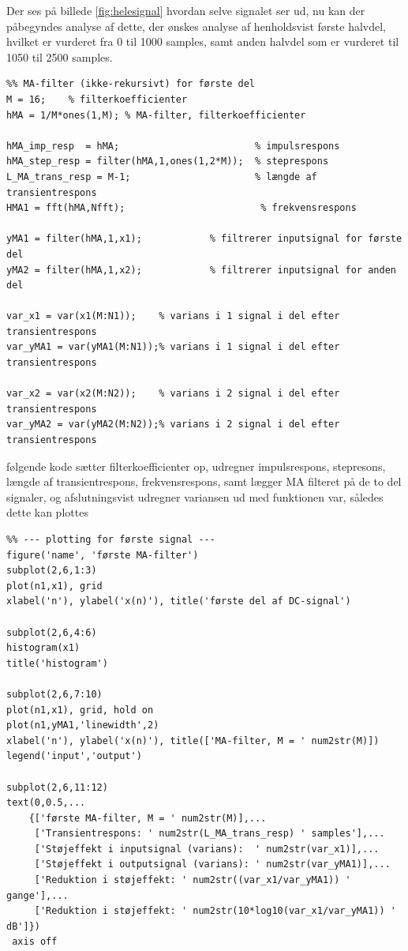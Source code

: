 \documentclass{article}
\begin{document}
Der ses på billede \ref{fig:helesignal} hvordan selve signalet ser ud, nu kan der påbegyndes analyse af dette, der ønskes analyse af henholdsvist første halvdel, hvilket er vurderet fra 0 til 1000 samples, samt anden halvdel som er vurderet til 1050 til 2500 samples.

\begin{lstlisting}
%% MA-filter (ikke-rekursivt) for første del
M = 16;    % filterkoefficienter
hMA = 1/M*ones(1,M); % MA-filter, filterkoefficienter

hMA_imp_resp  = hMA;                        % impulsrespons
hMA_step_resp = filter(hMA,1,ones(1,2*M));  % steprespons
L_MA_trans_resp = M-1;                      % længde af transientrespons
HMA1 = fft(hMA,Nfft);                        % frekvensrespons

yMA1 = filter(hMA,1,x1);            % filtrerer inputsignal for første del
yMA2 = filter(hMA,1,x2);            % filtrerer inputsignal for anden del

var_x1 = var(x1(M:N1));    % varians i 1 signal i del efter transientrespons
var_yMA1 = var(yMA1(M:N1));% varians i 1 signal i del efter transientrespons

var_x2 = var(x2(M:N2));    % varians i 2 signal i del efter transientrespons
var_yMA2 = var(yMA2(M:N2));% varians i 2 signal i del efter transientrespons
\end{lstlisting}

følgende kode sætter filterkoefficienter op, udregner impulsrespons, stepresons, længde af transientrespons, frekvensrespons, samt lægger MA filteret på de to del signaler, og afslutningsvist udregner variansen ud med funktionen var, således dette kan plottes

\begin{lstlisting}
%% --- plotting for første signal ---
figure('name', 'første MA-filter')
subplot(2,6,1:3)
plot(n1,x1), grid
xlabel('n'), ylabel('x(n)'), title('første del af DC-signal')

subplot(2,6,4:6)
histogram(x1)
title('histogram')

subplot(2,6,7:10)
plot(n1,x1), grid, hold on
plot(n1,yMA1,'linewidth',2)
xlabel('n'), ylabel('x(n)'), title(['MA-filter, M = ' num2str(M)])
legend('input','output')

subplot(2,6,11:12)
text(0,0.5,...
    {['første MA-filter, M = ' num2str(M)],...
     ['Transientrespons: ' num2str(L_MA_trans_resp) ' samples'],...
     ['Støjeffekt i inputsignal (varians):  ' num2str(var_x1)],...
     ['Støjeffekt i outputsignal (varians): ' num2str(var_yMA1)],...
     ['Reduktion i støjeffekt: ' num2str((var_x1/var_yMA1)) ' gange'],...
     ['Reduktion i støjeffekt: ' num2str(10*log10(var_x1/var_yMA1)) ' dB']})
 axis off
\end{lstlisting}
\end{document}
